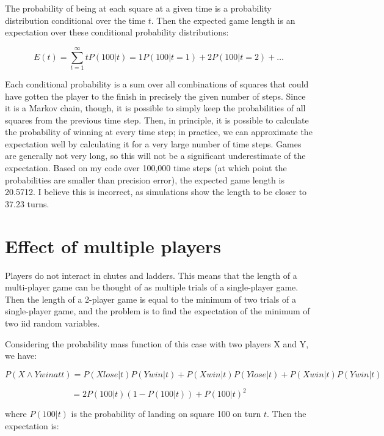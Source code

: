 \documentclass{article}
\begin{document}
The probability of being at each square at a given time is a
probability distribution conditional over the time $t$. Then the
expected game length is an expectation over these conditional
probability distributions:

\begin{equation}
E(t) = \sum_{t=1}^{\infty}{tP(100|t)} = 1P(100|t=1) + 2P(100|t=2) + \dots
\end{equation}

\noindent Each conditional probability is a sum over all combinations
of squares that could have gotten the player to the finish in
precisely the given number of steps. Since it is a Markov chain,
though, it is possible to simply keep the probabilities of all squares
from the previous time step. Then, in principle, it is possible to
calculate the probability of winning at every time step; in practice,
we can approximate the expectation well by calculating it for a very
large number of time steps. Games are generally not very long, so this
will not be a significant underestimate of the expectation. Based on
my code over 100,000 time steps (at which point the probabilities
are smaller than precision error), the expected game length is
20.5712. I believe this is incorrect, as simulations show the length
to be closer to 37.23 turns.

\section{Effect of multiple players}

Players do not interact in chutes and ladders. This means that the
length of a multi-player game can be thought of as multiple trials of
a single-player game. Then the length of a 2-player game is equal to
the minimum of two trials of a single-player game, and the problem is
to find the expectation of the minimum of two iid random variables.

Considering the probability mass function of this case with two
players X and Y, we have:

\begin{equation}
P(X \wedge Y win at t) = P(X lose|t)P(Y win|t) + P(X win|t)P(Y lose|t) + P(X win|t)P(Y win|t)
\end{equation}

\begin{equation}
= 2P(100|t)(1-P(100|t))+P(100|t)^2
\end{equation}

\noindent where $P(100|t)$ is the probability of landing on square 100
on turn $t$. Then the expectation is:
\end{document}
